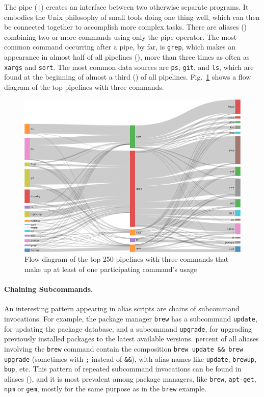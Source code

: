 \documentclass[smallextended,natbib]{svjour3}
\newcommand{\num}[1]{\numprint{#1}}
\newcommand{\per}[1]{\numprint[\%]{#1}}
\newcommand{\cmd}[1]{{\texttt{#1}}}
\begin{document}
The pipe (\verb`|`) creates an interface between two otherwise separate programs.
It embodies the Unix philosophy of small tools doing one thing well, which can then be connected together to accomplish more complex tasks.
There are \num{74719} aliases (\per{3.39}) combining two or more commands using only the pipe operator.
The most common command occurring after a pipe, by far, is \cmd{grep}, which makes an appearance in almost half of all pipelines (\per{46.16}), more than three times as often as \cmd{xargs} and \cmd{sort}.
The most common data sources are \cmd{ps}, \cmd{git}, and \cmd{ls}, which are found at the beginning of almost a third (\per{32}) of all pipelines.
Fig.~\ref{fig:flow} shows a flow diagram of the top pipelines with three commands.

\begin{figure}
	\centering    
	\includegraphics[width=\columnwidth]{fig-flow_250.png}
	\caption{Flow diagram of the top 250 pipelines with three commands that make up at least \per{10} of one participating command's usage}
	\label{fig:flow}
\end{figure}

\paragraph{Chaining Subcommands.}

An interesting pattern appearing in alias scripts are chains of subcommand invocations.
For example, the package manager \cmd{brew} has a subcommand \texttt{update}, for updating the package database, and a subcommand \texttt{upgrade}, for upgrading previously installed packages to the latest available versions.
\per{28.08} percent of all aliases involving the \cmd{brew} command contain the composition \verb|brew update && brew upgrade| (sometimes with \verb|;| instead of \verb|&&|), with alias names like \verb|update|, \verb|brewup|, \verb|bup|, etc.
This pattern of repeated subcommand invocations can be found in \num{22062} aliases (\per{1}), and it is most prevalent among package managers, like \cmd{brew}, \cmd{apt-get}, \cmd{npm} or \cmd{gem}, mostly for the same purpose as in the \cmd{brew} example.
\end{document}
